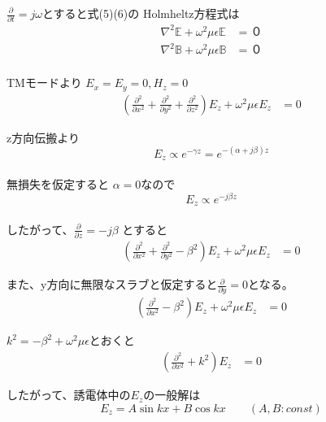 \documentclass[a4paper,10pt]{bxjsarticle}
\begin{document}
$\frac{\partial}{\partial t} = j\omega$とすると式(5)(6)の Holmheltz方程式は
\begin{align*}
    \nabla^2 \mathbb{E} + \omega^2 \mu \epsilon \mathbb{E} &= ０ \\
    \nabla^2 \mathbb{B} + \omega^2 \mu \epsilon \mathbb{B} &= ０ \\
\end{align*}

TMモードより $E_x = E_y = 0, H_z = 0$
\begin{align*}
    \left( 
        \frac{\partial^2}{\partial x^2} 
        + \frac{\partial^2}{\partial y^2} 
        + \frac{\partial^2}{\partial z^2} 
    \right) E_z
    + \omega^2 \mu \epsilon E_z
    &= 0    
\end{align*}

z方向伝搬より $$E_z \propto e^{-\gamma z} = e^{-(\alpha + j \beta)z}$$ \\
無損失を仮定すると $\alpha = 0$なので $$E_z \propto e^{ -j \beta z}$$ \\
したがって、$ \frac{\partial}{\partial z} = -j \beta $ とすると
\begin{align*} 
    \left( 
        \frac{\partial^2}{\partial x^2} 
        + \frac{\partial^2}{\partial y^2} 
        - \beta^2 
    \right) E_z
    + \omega^2 \mu \epsilon E_z
    &= 0
\end{align*}

また、y方向に無限なスラブと仮定すると$\frac{\partial}{\partial y} = 0$となる。
\begin{align*} 
    \left( 
        \frac{\partial^2}{\partial x^2} 
        - \beta^2 
    \right) E_z
    + \omega^2 \mu \epsilon E_z
    &= 0
\end{align*}

$k^2 = -\beta^2 + \omega^2 \mu \epsilon$とおくと
\begin{align*} 
    \left( 
        \frac{\partial^2}{\partial x^2} 
        + k^2 
    \right) E_z
    &= 0
\end{align*}

したがって、誘電体中の$E_z$の一般解は
$$ E_z = A \sin k x + B \cos k x \qquad (A,B : const) $$
\end{document}
